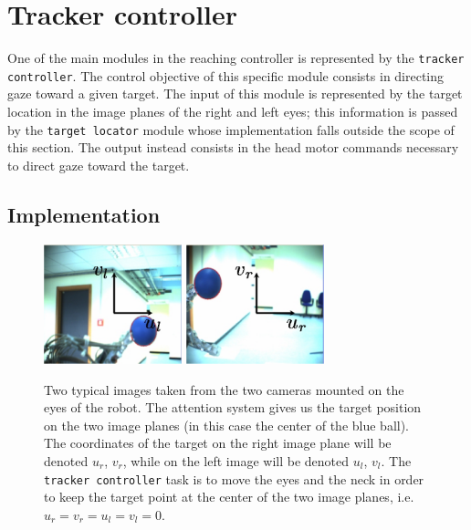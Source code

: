 \section{Tracker controller}
\label{Sec:TrackerController}

One of the main modules in the reaching controller is represented by the {\tt tracker controller}. The control objective of this specific module consists in directing gaze toward a given target. The input of this module is represented by the target location in the image planes of the right and left eyes; this information is passed by the {\tt target locator} module whose implementation falls outside the scope of this section. The output instead consists in the head motor commands necessary to direct gaze toward the target. 

\subsection{Implementation}

\begin{figure}[tbp]
\centering
\includegraphics[width=40mm]{Figure/LeftImage.eps} \hspace{1cm}
\includegraphics[width=40mm]{Figure/RightImage.eps}
\caption{Two typical images taken from the two cameras mounted on the eyes of the robot. The attention system gives us the target position on the two image planes (in this case the center of the blue ball). The coordinates of the target on the right image plane will be denoted $u_r$, $v_r$, while on the left image will be denoted $u_l$, $v_l$. The {\tt tracker controller} task is to move the eyes and the neck in order to keep the target point at the center of the two image planes, i.e. $u_r = v_r = u_l = v_l = 0$.}
\label{Fig:ImagePlane}
\end{figure}
 
